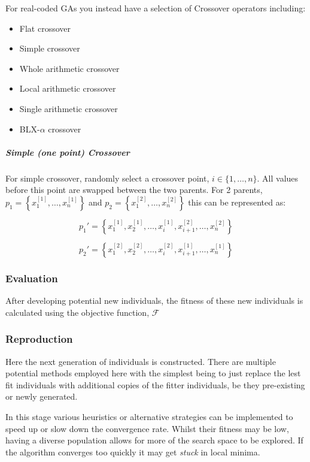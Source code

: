 For real-coded GAs you instead have a selection of Crossover operators including:

\begin{itemize}
    \item Flat crossover
    \item Simple crossover
    \item Whole arithmetic crossover
    \item Local arithmetic crossover
    \item Single arithmetic crossover
    \item BLX-$\alpha$ crossover
\end{itemize}


\subparagraph{Simple (one point) Crossover}

For simple crossover, randomly select a crossover point, $i \in \{1,\ldots,n \}$. All values before this point are swapped between the two parents. For 2 parents, $p_1 = \left\{ x_1^{[1]},\ldots,x_n^{[1]}\right\}$ and $p_2 = \left\{ x_1^{[2]},\ldots,x_n^{[2]}\right\}$ this can be represented as:

\begin{equation}
    p_1' = \left\{ x_1^{[1]},x_2^{[1]}, \ldots, x_i^{[1]}, x_{i+1}^{[2]},\ldots, x_n^{[2]} \right\} 
\end{equation}

\begin{equation}
    p_2' = \left\{ x_1^{[2]},x_2^{[2]}, \ldots, x_i^{[2]}, x_{i+1}^{[1]},\ldots, x_n^{[1]} \right\}
\end{equation}

\subsubsection{Evaluation}
After developing potential new individuals, the fitness of these new individuals is calculated using the objective function, $\mathcal{F}$

\subsubsection{Reproduction}
Here the next generation of individuals is constructed. There are multiple potential methods employed here with the simplest being to just replace the lest fit individuals with additional copies of the fitter individuals, be they pre-existing or newly generated.

In this stage various heuristics or alternative strategies can be implemented to speed up or slow down the convergence rate. Whilst their fitness may be low, having a diverse population allows for more of the search space to be explored. If the algorithm converges too quickly it may get \textit{stuck} in local minima. 


